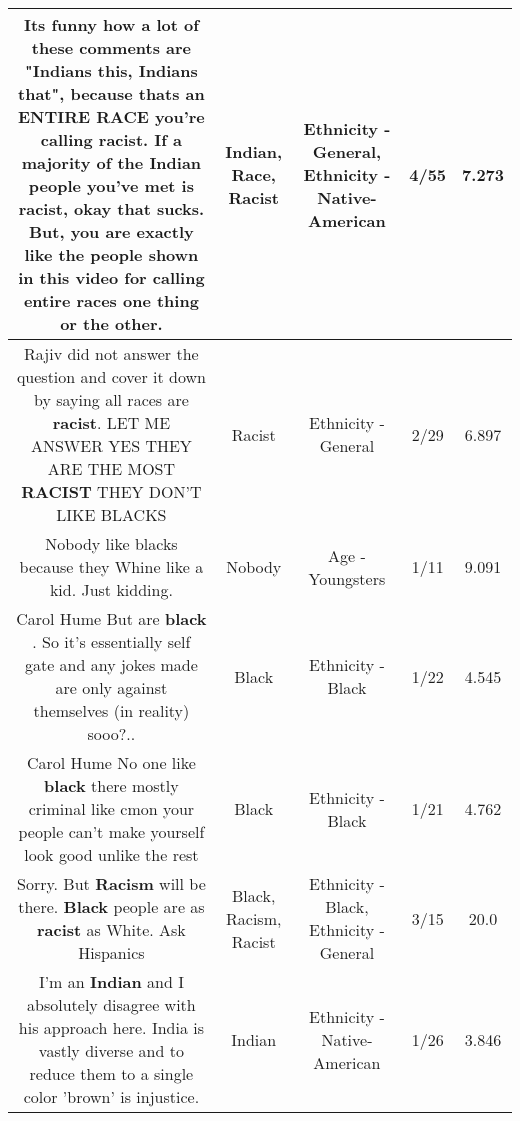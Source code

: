 \documentclass[11pt]{article}
\newlength\mylength
\begin{document}
\begin{center}
\begin{longtable}{|C{.65\mylength}|C{.30\mylength}|C{.12\mylength}|C{.12\mylength}|C{.12\mylength}|}
  \small Its funny how a lot of these comments are "Indians this, Indians that", because thats an ENTIRE \textbf{RACE} you're calling \textbf{racist}. If a majority of the \textbf{Indian} people you've met is \textbf{racist}, okay that sucks. But, you are exactly like the people shown in this video for calling entire races one thing or the other.\normalsize   & Indian, Race, Racist & Ethnicity - General, Ethnicity - Native-American & 4/55 & 7.273 \\  \hline
  \small Rajiv did not answer the question and cover it down by saying all races are \textbf{racist}. LET ME ANSWER YES THEY ARE THE MOST \textbf{RACIST} THEY DON'T LIKE BLACKS\normalsize   & Racist & Ethnicity - General & 2/29 & 6.897 \\  \hline
  \small Nobody like blacks because they Whine like a kid. Just kidding.\normalsize   & Nobody & Age - Youngsters & 1/11 & 9.091 \\  \hline
  \small Carol Hume But are \textbf{black} . So it's essentially self gate and any jokes made are only against themselves  (in reality) sooo?..\normalsize   & Black & Ethnicity - Black & 1/22 & 4.545 \\  \hline
  \small Carol Hume No one like \textbf{black} there mostly criminal like cmon your people can't make yourself look good unlike the rest\normalsize   & Black & Ethnicity - Black & 1/21 & 4.762 \\  \hline
  \small Sorry. But \textbf{Racism} will be there. \textbf{Black} people are as \textbf{racist} as White. Ask Hispanics\normalsize   & Black, Racism, Racist & Ethnicity - Black, Ethnicity - General & 3/15 & 20.0 \\  \hline
  \small I'm an \textbf{Indian} and I absolutely disagree with his approach here. India is vastly diverse and to reduce them to a single color 'brown' is injustice.\normalsize   & Indian & Ethnicity - Native-American & 1/26 & 3.846 \\  \hline

\end{longtable}
\end{center}
\end{document}
